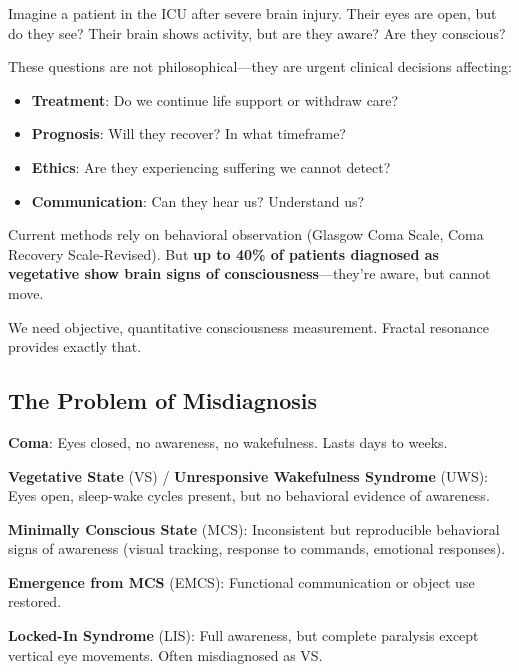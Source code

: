 \begin{intuitive}
Imagine a patient in the ICU after severe brain injury. Their eyes are open, but do they see? Their brain shows activity, but are they aware? Are they conscious?

These questions are not philosophical—they are urgent clinical decisions affecting:
\begin{itemize}
\item \textbf{Treatment}: Do we continue life support or withdraw care?
\item \textbf{Prognosis}: Will they recover? In what timeframe?
\item \textbf{Ethics}: Are they experiencing suffering we cannot detect?
\item \textbf{Communication}: Can they hear us? Understand us?
\end{itemize}

Current methods rely on behavioral observation (Glasgow Coma Scale, Coma Recovery Scale-Revised). But \textbf{up to 40\% of patients diagnosed as vegetative show brain signs of consciousness}\cite{monti2010}—they're aware, but cannot move.

We need objective, quantitative consciousness measurement. Fractal resonance provides exactly that.
\end{intuitive}

\subsection{The Problem of Misdiagnosis}

\begin{defn}\label{def:doc}
\textbf{Coma}: Eyes closed, no awareness, no wakefulness. Lasts days to weeks.

\textbf{Vegetative State} (VS) / \textbf{Unresponsive Wakefulness Syndrome} (UWS): Eyes open, sleep-wake cycles present, but no behavioral evidence of awareness\cite{laureys2010}.

\textbf{Minimally Conscious State} (MCS): Inconsistent but reproducible behavioral signs of awareness (visual tracking, response to commands, emotional responses)\cite{giacino2002}.

\textbf{Emergence from MCS} (EMCS): Functional communication or object use restored.

\textbf{Locked-In Syndrome} (LIS): Full awareness, but complete paralysis except vertical eye movements. Often misdiagnosed as VS\cite{bruno2011}.
\end{defn}

